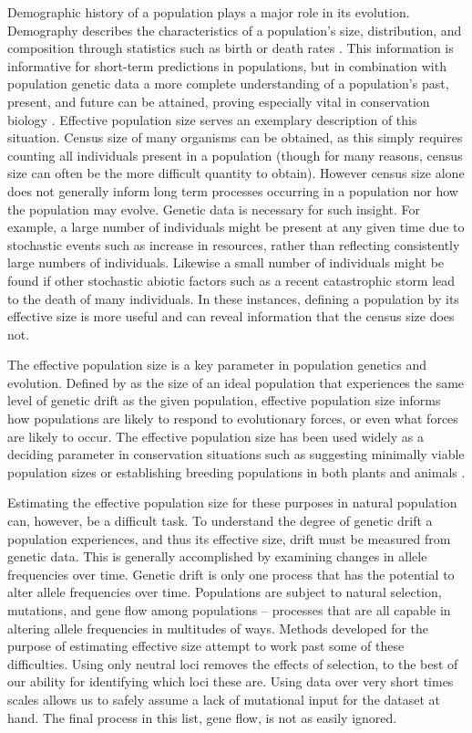 Demographic history of a population plays a major role in its evolution. Demography describes the characteristics of a population's size, distribution, and composition through statistics such as birth or death rates \citep{Pavlik:2000}. This information is informative for short-term predictions in populations, but in combination with population genetic data a more complete understanding of a population's past, present, and future can be attained, proving especially vital in conservation biology \citep{Lande:1988, Avise:1995, Nunney:1993}. Effective population size serves an exemplary description of this situation. Census size of many organisms can be obtained, as this simply requires counting all individuals present in a population (though for many reasons, census size can often be the more difficult quantity to obtain). However census size alone does not generally inform long term processes occurring in a population nor how the population may evolve. Genetic data is necessary for such insight. For example, a large number of individuals might be present at any given time due to stochastic events such as increase in resources, rather than reflecting consistently large numbers of individuals. Likewise a small number of individuals might be found if other stochastic abiotic factors such as a recent catastrophic storm lead to the death of many individuals. In these instances, defining a population by its effective size is more useful and can reveal information that the census size does not. 

The effective population size is a key parameter in population genetics and evolution. Defined by \citet{Wright:1931} as the size of an ideal population that experiences the same level of genetic drift as the given population, effective population size informs how populations are likely to respond to evolutionary forces, or even what forces are likely to occur. The effective population size has been used widely as a deciding parameter in conservation situations such as suggesting minimally viable population sizes or establishing breeding populations in both plants and animals \citep{Lande:1987, Soule:1987, Ellstrand:1993}.

Estimating the effective population size for these purposes in natural population can, however, be a difficult task. To understand the degree of genetic drift a population experiences, and thus its effective size, drift must be measured from genetic data. This is generally accomplished by examining changes in allele frequencies over time. Genetic drift is only one process that has the potential to alter allele frequencies over time. Populations are subject to natural selection, mutations, and gene flow among populations -- processes that are all capable in altering allele frequencies in multitudes of ways. Methods developed for the purpose of estimating effective size attempt to work past some of these difficulties. Using only neutral loci removes the effects of selection, to the best of our ability for identifying which loci these are. Using data over very short times scales allows us to safely assume a lack of mutational input for the dataset at hand. The final process in this list, gene flow, is not as easily ignored.

